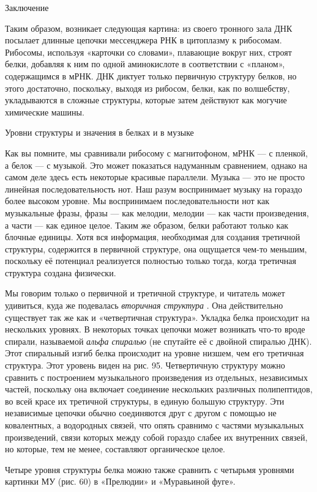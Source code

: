 \documentclass[../main.tex]{subfiles}
\begin{document}
Заключение

Таким образом, возникает следующая картина: из своего тронного зала ДНК посылает длинные цепочки мессенджера РНК в цитоплазму к рибосомам. Рибосомы, используя «карточки со словами», плавающие вокруг них, строят белки, добавляя к ним по одной аминокислоте в соответствии с «планом», содержащимся в мРНК. ДНК диктует только первичную структуру белков, но этого достаточно, поскольку, выходя из рибосом, белки, как по волшебству, укладываются в сложные структуры, которые затем действуют как могучие химические машины.

Уровни структуры и значения в белках и в музыке

Как вы помните, мы сравнивали рибосому с магнитофоном, мРНК --- с пленкой, а белок --- с музыкой. Это может показаться надуманным сравнением, однако на самом деле здесь есть некоторые красивые параллели. Музыка --- это не просто линейная последовательность нот. Наш разум воспринимает музыку на гораздо более высоком уровне. Мы воспринимаем последовательности нот как музыкальные фразы, фразы --- как мелодии, мелодии --- как части произведения, а части --- как единое целое. Таким же образом, белки работают только как блочные единицы. Хотя вся информация, необходимая для создания третичной структуры, содержится в первичной структуре, она ощущается чем-то меньшим, поскольку её потенциал реализуется полностью только тогда, когда третичная структура создана физически.

Мы говорим только о первичной и третичной структуре, и читатель может удивиться, куда же подевалась \emph{вторичная структура} . Она действительно существует так же как и «четвертичная структура». Укладка белка происходит на нескольких уровнях. В некоторых точках цепочки может возникать что-то вроде спирали, называемой \emph{альфа спиралью} (не спутайте её с двойной спиралью ДНК). Этот спиральный изгиб белка происходит на уровне низшем, чем его третичная структура. Этот уровень виден на рис. 95. Четвертичную структуру можно сравнить с построением музыкального произведения из отдельных, независимых частей, поскольку она включает соединение нескольких различных полипептидов, во всей красе их третичной структуры, в единую большую структуру. Эти независимые цепочки обычно соединяются друг с другом с помощью не ковалентных, а водородных связей, что опять сравнимо с частями музыкальных произведений, связи которых между собой гораздо слабее их внутренних связей, но которые, тем не менее, составляют органическое целое.

Четыре уровня структуры белка можно также сравнить с четырьмя уровнями картинки МУ (рис. 60) в «Прелюдии» и «Муравьиной фуге».
\end{document}
